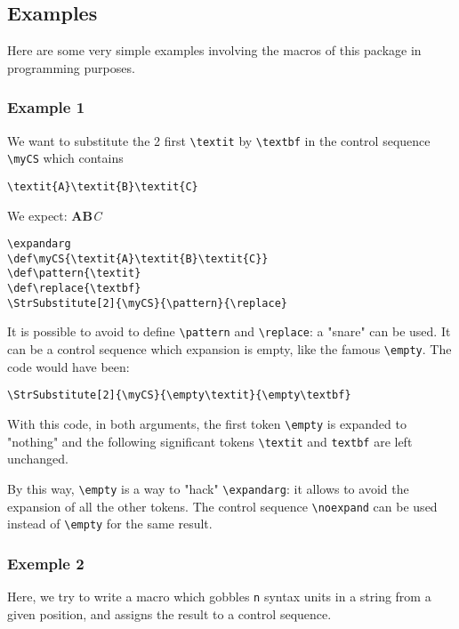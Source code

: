 \documentclass[a4paper,10pt]{article}
\newcommand\USs{syntax units\xspace}
\newcommand\styleexercice{\footnotesize}
\newcommand\verbinline{\lstinline[basicstyle=\normalsize\ttfamily]}
\begin{document}
\subsection{Examples}
\label{exemples}
Here are some very simple examples involving the macros of this package in programming purposes.

\subsubsection{Example 1}
We want to substitute the 2 first \verbinline|\textit| by \verbinline|\textbf| in the control sequence \verb|\myCS| which contains \par\smallskip
\hfill\verbinline|\textit{A}\textit{B}\textit{C}|\hfill{}
\medskip

We expect: \textbf{A}\textbf{B}\textit{C}\medskip

\begin{minipage}[c]{0.65\linewidth}
\begin{lstlisting}
\expandarg
\def\myCS{\textit{A}\textit{B}\textit{C}}
\def\pattern{\textit}
\def\replace{\textbf}
\StrSubstitute[2]{\myCS}{\pattern}{\replace}
\end{lstlisting}%
\end{minipage}\hfill
\begin{minipage}[c]{0.35\linewidth}
	\styleexercice
	\expandarg
	\def\myCS{\textit{A}\textit{B}\textit{C}}
	\def\pattern{\textit}
	\def\replace{\textbf}
	\StrSubstitute[2]{\myCS}{\pattern}{\replace}
\end{minipage}%
\medskip

It is possible to avoid to define \verb|\pattern| and \verb|\replace|: a "snare" can be used. It can be a control sequence which expansion is empty, like the famous \verbinline|\empty|. The code would have been:\par\nobreak\smallskip
\hfil\verbinline|\StrSubstitute[2]{\myCS}{\empty\textit}{\empty\textbf}|\hfil{}\medskip

With this code, in both arguments, the first token \verbinline|\empty| is expanded to "nothing" and the following significant tokens \verbinline|\textit| and \verbinline|textbf| are left unchanged.\smallskip

By this way, \verbinline|\empty| is a way to "hack" \verbinline|\expandarg|: it allows to avoid the expansion of all the other tokens. The control sequence \verbinline|\noexpand| can be used instead of \verbinline|\empty| for the same result.

\subsubsection{Exemple 2}
Here, we try to write a macro which gobbles \verb|n| \USs in a string from a given position, and assigns the result to a control sequence.
\end{document}
